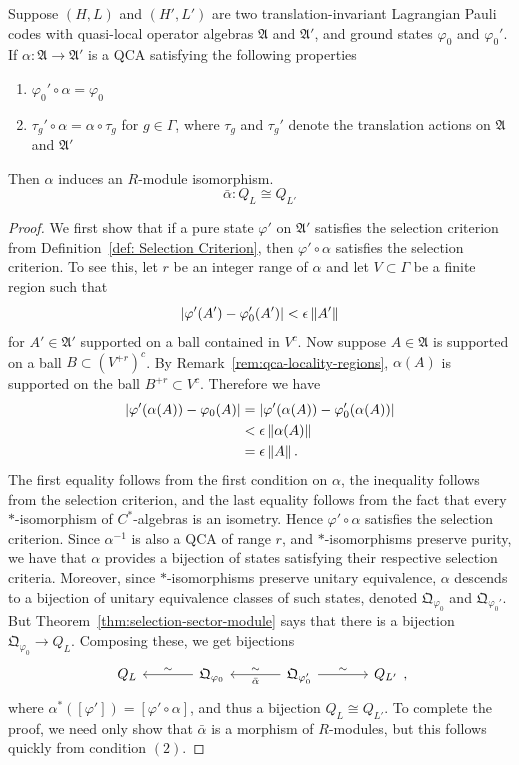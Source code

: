\documentclass[11pt]{amsart}
\begin{document}
\begin{thm}\label{thm:qca-fusion-module}
    Suppose $(H,L)$ and $(H',L')$ are two translation-invariant Lagrangian Pauli codes with quasi-local operator algebras $\mathfrak A$ and $\mathfrak A'$, and ground states $\varphi_0$ and $\varphi_0'$. If $\alpha:\mathfrak A\to\mathfrak A'$ is a QCA satisfying the following properties
    \begin{enumerate}
        \item $\varphi_0'\circ \alpha =\varphi_0$
        \item $\tau_g'\circ\alpha=\alpha \circ\tau_g $ for $g\in \Gamma$, where $\tau_g$ and $\tau_g'$ denote the translation actions on $\mathfrak A$ and $\mathfrak A'$
    \end{enumerate}
    Then $\alpha$ induces an $R$-module isomorphism.
    \[
        \bar\alpha: Q_L \cong Q_{L'}
    \]
\begin{proof}
We first show that if a pure state $\varphi'$ on $\mathfrak A'$ satisfies the selection criterion from Definition~\ref{def: Selection Criterion}, then $\varphi'\circ\alpha$ satisfies the selection criterion. To see this, let $r$ be an integer range of $\alpha$ and let $V\subset\Gamma$ be a finite region such that
\[
|\varphi'(A')-\varphi_0'(A')|<\epsilon\left\lVert A'\right\rVert
\]
for $A'\in\mathfrak A'$ supported on a ball contained in $V^c$. Now suppose $A\in\mathfrak A$ is supported on a ball $B\subset(V^{+r})^c$. By Remark~\ref{rem:qca-locality-regions}, $\alpha(A)$ is supported on the ball $B^{+r}\subset V^c$. Therefore we have
\begin{align*}
|\varphi'(\alpha(A))-\varphi_0(A)|
&=|\varphi'(\alpha(A))-\varphi_0'(\alpha(A))|\\
&<\epsilon\left\lVert \alpha(A)\right\rVert\\
&=\epsilon\left\lVert A\right\rVert.
\end{align*}
The first equality follows from the first condition on $\alpha$, the inequality follows from the selection criterion, and the last equality follows from the fact that every $*$-isomorphism of $C^*$-algebras is an isometry. Hence $\varphi'\circ\alpha$ satisfies the selection criterion. Since $\alpha^{-1}$ is also a QCA of range $r$, and $*$-isomorphisms preserve purity, we have that $\alpha$ provides a bijection of states satisfying their respective selection criteria. Moreover, since $*$-isomorphisms preserve unitary equivalence, $\alpha$ descends to a bijection of unitary equivalence classes of such states, denoted $\mathfrak Q_{\varphi_0}$ and $\mathfrak Q_{\varphi_0'}$. But Theorem~\ref{thm:selection-sector-module} says that there is a bijection $\mathfrak Q_{\varphi_0}\to Q_L$. Composing these, we get bijections
\[
\begin{tikzcd}[column sep=large]
Q_L &
\mathfrak Q_{\varphi_0} \arrow[l,"\sim"'] &
\mathfrak Q_{\varphi_0'} \arrow[l,"\bar\alpha"',"\sim",swap] \arrow[r,"\sim"] &
Q_{L'}
\end{tikzcd},
\]
where $\alpha^*([\varphi'])=[\varphi'\circ\alpha]$, and thus a bijection $Q_L\cong Q_{L'}$. To complete the proof, we need only show that $\bar\alpha$ is a morphism of $R$-modules, but this follows quickly from condition $(2)$.
\end{proof}
\end{thm}
\end{document}

